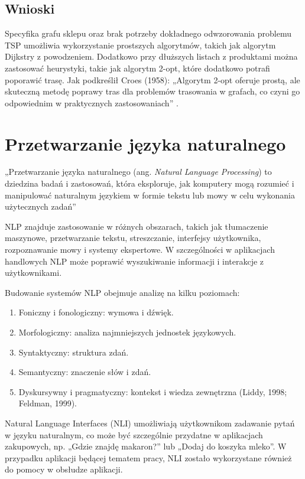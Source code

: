 \subsection{Wnioski}

Specyfika grafu sklepu oraz brak potrzeby dokładnego odwzorowania problemu TSP umożliwia wykorzystanie prostszych algorytmów, takich jak algorytm Dijkstry z powodzeniem. Dodatkowo przy dłuższych listach z produktami można zastosować heurystyki, takie jak algorytm 2-opt, które dodatkowo potrafi poporawić trasę. Jak podkreślił Croes (1958): „Algorytm 2-opt oferuje prostą, ale skuteczną metodę poprawy tras dla problemów trasowania w grafach, co czyni go odpowiednim w praktycznych zastosowaniach” \cite{Croes1958}.


\section{Przetwarzanie języka naturalnego}

„Przetwarzanie języka naturalnego (ang. \textit{Natural Language Processing}) to dziedzina badań i zastosowań, która eksploruje, jak komputery mogą rozumieć i manipulować naturalnym językiem w formie tekstu lub mowy w celu wykonania użytecznych zadań” \\ \cite{Chowdhary2020} 


NLP znajduje zastosowanie w różnych obszarach, takich jak tłumaczenie maszynowe, przetwarzanie tekstu, streszczanie, interfejsy użytkownika, rozpoznawanie mowy i systemy ekspertowe. W szczególności w aplikacjach handlowych NLP może poprawić wyszukiwanie informacji i interakcje z użytkownikami.

Budowanie systemów NLP obejmuje analizę na kilku poziomach:
\begin{enumerate}
    \item Foniczny i fonologiczny: wymowa i dźwięk.
    \item Morfologiczny: analiza najmniejszych jednostek językowych.
    \item Syntaktyczny: struktura zdań.
    \item Semantyczny: znaczenie słów i zdań.
    \item Dyskursywny i pragmatyczny: kontekst i wiedza zewnętrzna (Liddy, 1998; Feldman, 1999). \cite{Chowdhary2020}
\end{enumerate}

Natural Language Interfaces (NLI) umożliwiają użytkownikom zadawanie pytań w języku naturalnym, co może być szczególnie przydatne w aplikacjach zakupowych, np. „Gdzie znajdę makaron?” lub „Dodaj do koszyka mleko”. W przypadku aplikacji będącej tematem pracy, NLI zostało wykorzystane również do pomocy w obsłudze aplikacji.

